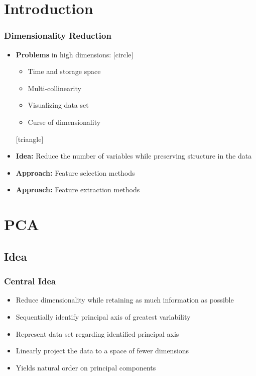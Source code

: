 \documentclass{beamer}
\theoremstyle{plain}
\theoremstyle{definition}
\begin{document}
\section{Introduction} 
\begin{frame}
\frametitle{Dimensionality Reduction} 

\begin{itemize}
\item \textbf{Problems} in high dimensions: 
[circle]
	\begin{itemize}
	\item Time and storage space
	\item Multi-collinearity 
	\item Visualizing data set
	\item Curse of dimensionality
	\end{itemize}
[triangle]
\item \textbf{Idea:} Reduce the number of variables while preserving structure in the data
\item \textbf{Approach:} Feature selection methods
\item \textbf{Approach:} Feature extraction methods

\end{itemize}
\end{frame}


\section{PCA} 
\subsection{Idea}
\begin{frame}\frametitle{Central Idea}
\begin{itemize}
\item Reduce dimensionality while retaining as much information as possible
\item Sequentially identify principal axis of greatest variability
\item Represent data set regarding identified principal axis
\item Linearly project the data to a space of fewer dimensions
\item Yields natural order on principal components
\end{itemize} 
\end{frame}
\end{document}
